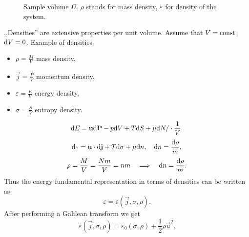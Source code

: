   \begin{figure}
    \centering
    \caption{Sample volume $\Omega$. $\rho$ stands for mass density, $\varepsilon$ for density of the system.}
    \label{fig:1.5}
  \end{figure}

  ,,Densities'' are extensive properties per unit volume.
  Assume that $V = \textrm{const}$, $\mathrm{d} V = 0$.
  Example of densities
  \begin{itemize}
    \item $\rho = \frac{M}{V}$ mass density,
    \item $\vec j = \frac{\vec P}{V}$ momentum density,
    \item $\varepsilon = \frac{E}{V}$ energy density,
    \item $\sigma = \frac{S}{V}$ entropy density.
  \end{itemize}
  \begin{displaymath}
    \mathrm{d} E = \mathbf{u} \mathrm{d} \mathbf{P} - p \mathrm{d} V + T \mathrm{d} S + \mu \mathrm{d} N / \cdot \frac{1}{V}.
  \end{displaymath}
  \begin{displaymath}
    \mathrm{d} \varepsilon = \mathbf{u} \cdot \mathrm{d} \mathbf{j} + T \mathrm{d} \sigma + \mu\mathrm{d} n, \quad \mathrm{d} n = \frac{\mathrm{d} \rho}{m},
  \end{displaymath}
  \begin{displaymath}
    \rho = \frac{M}{V} = \frac{Nm}{V} = nm \quad \Longrightarrow \quad \mathrm{d} n = \frac{\mathrm{d} \rho}{m}.
  \end{displaymath}
  Thus the energy fundamental representation in terms of densities can be written as
  \begin{displaymath}
    \varepsilon = \varepsilon(\vec j, \sigma, \rho).
  \end{displaymath}
  After performing a Galilean transform we get
  \begin{displaymath}
    \varepsilon(\vec j, \sigma, \rho) = \varepsilon_0(\sigma, \rho) + \frac{1}{2} \rho \vec u ^2.
  \end{displaymath}
  
